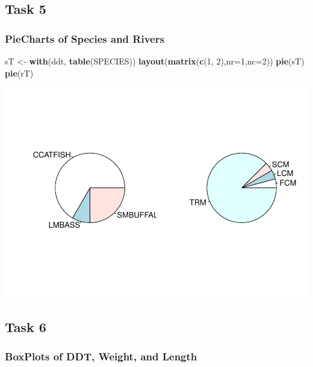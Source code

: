 \documentclass[]{article}
\newenvironment{Shaded}{\begin{snugshade}}{\end{snugshade}}
\newcommand{\KeywordTok}[1]{\textcolor[rgb]{0.13,0.29,0.53}{\textbf{#1}}}
\newcommand{\DataTypeTok}[1]{\textcolor[rgb]{0.13,0.29,0.53}{#1}}
\newcommand{\DecValTok}[1]{\textcolor[rgb]{0.00,0.00,0.81}{#1}}
\newcommand{\StringTok}[1]{\textcolor[rgb]{0.31,0.60,0.02}{#1}}
\newcommand{\NormalTok}[1]{#1}
\begin{document}
\subsection{Task 5}\label{task-5}

\subsubsection{PieCharts of Species and
Rivers}\label{piecharts-of-species-and-rivers}

\begin{Shaded}
\begin{Highlighting}[]
\NormalTok{sT <-}\StringTok{ }\KeywordTok{with}\NormalTok{(ddt, }\KeywordTok{table}\NormalTok{(SPECIES))}
\KeywordTok{layout}\NormalTok{(}\KeywordTok{matrix}\NormalTok{(}\KeywordTok{c}\NormalTok{(}\DecValTok{1}\NormalTok{, }\DecValTok{2}\NormalTok{),}\DataTypeTok{nr=}\DecValTok{1}\NormalTok{,}\DataTypeTok{nc=}\DecValTok{2}\NormalTok{))}
\KeywordTok{pie}\NormalTok{(sT)}
\KeywordTok{pie}\NormalTok{(rT)}
\end{Highlighting}
\end{Shaded}

\includegraphics{./tex2pdf.5760/2d07a333f90b5781803b7229f32ae7f919c2c85b.pdf}

\subsection{Task 6}\label{task-6}

\subsubsection{BoxPlots of DDT, Weight, and
Length}\label{boxplots-of-ddt-weight-and-length}
\end{document}
